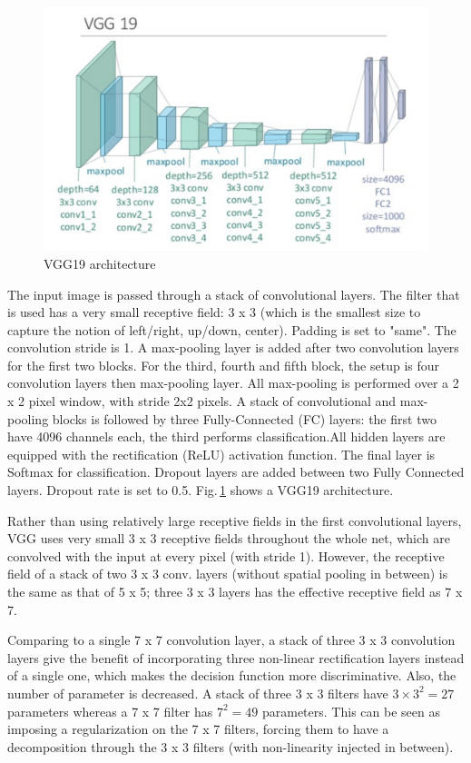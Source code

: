 \begin{figure}[h]
	\centering
	\includegraphics[width=\textwidth]{Figs/vgg.png}
    \caption{VGG19 architecture}
    \label{VGG}
\end{figure}

The input image is passed through a stack of convolutional layers. The filter that is used has a very small receptive field: 3 x 3 (which is the smallest size to capture the notion of left/right, up/down, center). Padding is set to "same". The convolution stride is 1. A max-pooling layer is added after two convolution layers for the first two blocks. For the third, fourth and fifth block, the setup is four convolution layers then max-pooling layer. All max-pooling is performed over a 2 x 2 pixel window, with stride 2x2 pixels. A stack of convolutional and max-pooling blocks is followed by three Fully-Connected (FC) layers: the first two have 4096 channels each, the third performs classification.All hidden layers are equipped with the rectification (ReLU) activation function. The final layer is Softmax for classification. Dropout layers are added between two Fully Connected layers. Dropout rate is set to 0.5. Fig.\,\ref{VGG} shows a VGG19 architecture.

Rather than using relatively large receptive fields in the first convolutional layers, VGG uses very small 3 x 3 receptive fields throughout the whole net, which are convolved with the input at every pixel (with stride 1). However, the receptive field of a stack of two 3 x 3 conv. layers (without spatial pooling in between) is the same as that of 5 x 5; three 3 x 3 layers has the effective receptive field as 7 x 7. 

Comparing to a single 7 x 7 convolution layer, a stack of three 3 x 3 convolution layers give the benefit of incorporating three non-linear rectification layers instead of a single one, which makes the decision function more discriminative. Also, the number of parameter is decreased. A stack of three 3 x 3 filters have $3\times3^2 = 27$ parameters whereas a 7 x 7 filter has $7^2 = 49$ parameters. This can be seen as imposing a regularization on the 7 x 7 filters, forcing them to have a decomposition through the 3 x 3 filters (with non-linearity injected in between).


